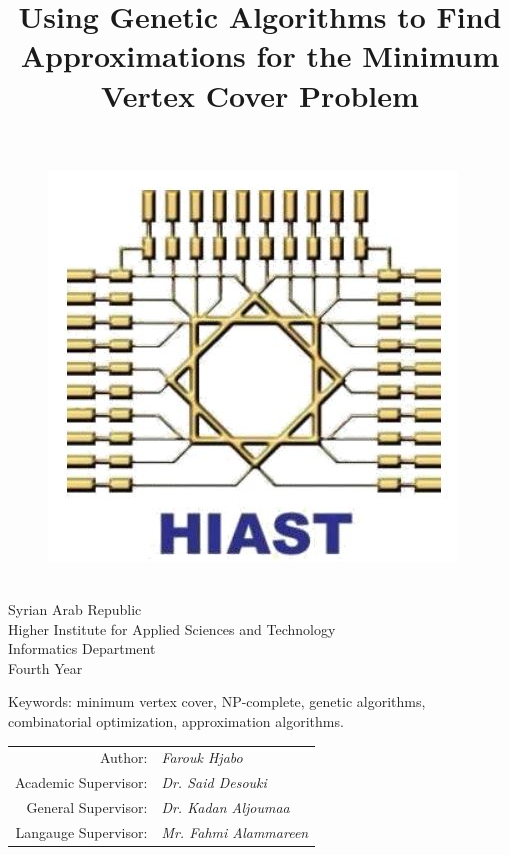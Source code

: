 \documentclass[12pt]{article}
\title{Using Genetic Algorithms to Find Approximations for the Minimum Vertex Cover Problem}
\author{}
\date{}
\newcommand{\lineSeparationLength}{2mm}
\begin{document}
\cleardoublepage{}

{
\begin{figure}
\hfill
\includegraphics[width=0.9\linewidth]{hiast}
\end{figure}

\ \\[\lineSeparationLength]
Syrian Arab Republic \\[\lineSeparationLength]
Higher Institute for Applied Sciences and Technology \\[\lineSeparationLength]
Informatics Department \\[\lineSeparationLength]
Fourth Year
}

\vspace{25mm}
{\let\newpage\relax\maketitle}

\vspace{-10mm}
\begin{center}
Keywords: minimum vertex cover, NP-complete, genetic algorithms,\\
combinatorial optimization, approximation algorithms.
\end{center}

\vspace{5mm}
\begin{center}
\begin{onehalfspacing}

\begin{tabular}{r l}
Author:					&	\textit{Farouk Hjabo} \\
Academic Supervisor:	&	\textit{Dr. Said Desouki} \\
General Supervisor:		&	\textit{Dr. Kadan Aljoumaa} \\
Langauge Supervisor:	&	\textit{Mr. Fahmi Alammareen} \\
\end{tabular}

\end{onehalfspacing}
\end{center}
\end{document}
